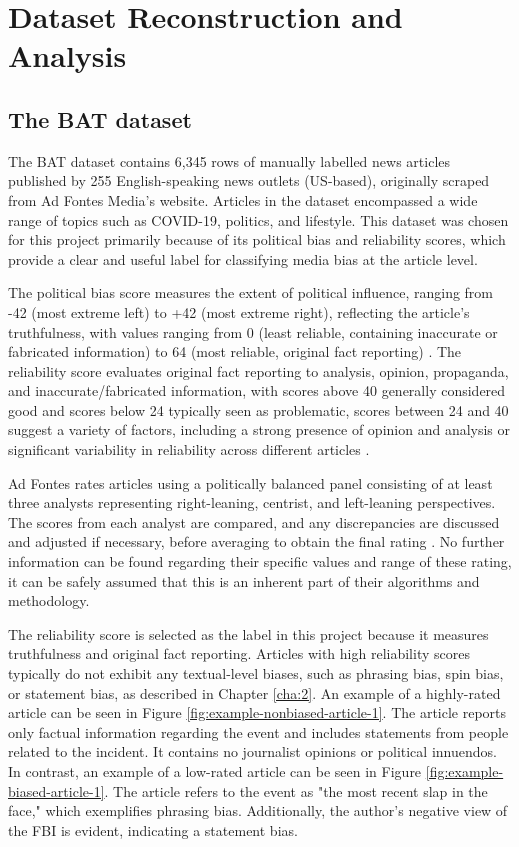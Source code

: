 \chapter{Dataset Reconstruction and Analysis}
\label{cha:3}

\section{The BAT dataset} \label{bat-characteristics}

The BAT dataset \cite{spinde-2023-bat} contains 6,345 rows of manually labelled news articles published by 255 English-speaking news outlets (US-based), originally scraped from Ad Fontes Media's website. Articles in the dataset encompassed a wide range of topics such as COVID-19, politics, and lifestyle. This dataset was chosen for this project primarily because of its political bias and reliability scores, which provide a clear and useful label for classifying media bias at the article level.

The political bias score measures the extent of political influence, ranging from -42 (most extreme left) to +42 (most extreme right), reflecting the article's truthfulness, with values ranging from 0 (least reliable, containing inaccurate or fabricated information) to 64 (most reliable, original fact reporting) \cite{adfontes-bias-reliability}. The reliability score evaluates original fact reporting to analysis, opinion, propaganda, and inaccurate/fabricated information, with scores above 40 generally considered good and scores below 24 typically seen as problematic, scores between 24 and 40 suggest a variety of factors, including a strong presence of opinion and analysis or significant variability in reliability across different articles \cite{adfontes-bias-reliability}.

Ad Fontes rates articles using a politically balanced panel consisting of at least three analysts representing right-leaning, centrist, and left-leaning perspectives. The scores from each analyst are compared, and any discrepancies are discussed and adjusted if necessary, before averaging to obtain the final rating \cite{adfontes-methodology}. No further information can be found regarding their specific values and range of these rating, it can be safely assumed that this is an inherent part of their algorithms and methodology.

The reliability score is selected as the label in this project because it measures truthfulness and original fact reporting. Articles with high reliability scores typically do not exhibit any textual-level biases, such as phrasing bias, spin bias, or statement bias, as described in Chapter \ref{cha:2}. An example of a highly-rated article can be seen in Figure \ref{fig:example-nonbiased-article-1}. The article reports only factual information regarding the event and includes statements from people related to the incident. It contains no journalist opinions or political innuendos. In contrast, an example of a low-rated article can be seen in Figure \ref{fig:example-biased-article-1}. The article refers to the event as "the most recent slap in the face," which exemplifies phrasing bias. Additionally, the author's negative view of the FBI is evident, indicating a statement bias.

